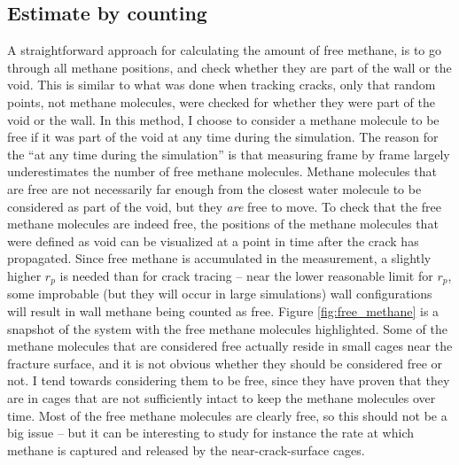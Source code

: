 \subsection{Estimate by counting}
\label{sec:freemethane_counting}
A straightforward approach for calculating the amount of free methane, is to go through all methane positions, and check whether they are part of the wall or the void. This is similar to what was done when tracking cracks, only that random points, not methane molecules, were checked for whether they were part of the void or the wall. In this method, I choose to consider a methane molecule to be free if it was part of the void at any time during the simulation. The reason for the ``at any time during the simulation'' is that measuring frame by frame largely underestimates the number of free methane molecules. Methane molecules that are free are not necessarily far enough from the closest water molecule to be considered as part of the void, but they \emph{are} free to move. To check that the free methane molecules are indeed free, the positions of the methane molecules that were defined as void can be visualized at a point in time after the crack has propagated. Since free methane is accumulated in the measurement, a slightly higher $r_p$ is needed than for crack tracing -- near the lower reasonable limit for $r_p$, some improbable (but they will occur in large simulations) wall configurations will result in wall methane being counted as free. Figure \ref{fig:free_methane} is a snapshot of the system with the free methane molecules highlighted. Some of the methane molecules that are considered free actually reside in small cages near the fracture surface, and it is not obvious whether they should be considered free or not. I tend towards considering them to be free, since they have proven that they are in cages that are not sufficiently intact to keep the methane molecules over time. Most of the free methane molecules are clearly free, so this should not be a big issue -- but it can be interesting to study for instance the rate at which methane is captured and released by the near-crack-surface cages.

